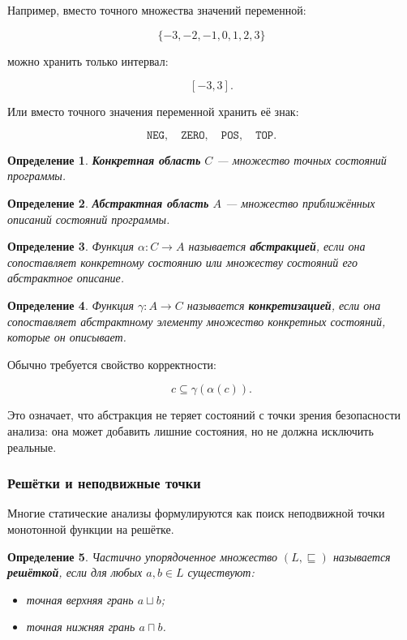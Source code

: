 \documentclass[12pt,a4paper]{article}
\newtheorem{definition}{Определение}
\begin{document}
Например, вместо точного множества значений переменной:

\[
\{ -3, -2, -1, 0, 1, 2, 3 \}
\]

можно хранить только интервал:

\[
[-3,3].
\]

Или вместо точного значения переменной хранить её знак:

\[
\texttt{NEG},\quad \texttt{ZERO},\quad \texttt{POS},\quad \texttt{TOP}.
\]

\begin{definition}
\textbf{Конкретная область} $C$ --- множество точных состояний программы.
\end{definition}

\begin{definition}
\textbf{Абстрактная область} $A$ --- множество приближённых описаний состояний программы.
\end{definition}

\begin{definition}
Функция $\alpha : C \to A$ называется \textbf{абстракцией}, если она сопоставляет конкретному состоянию или множеству состояний его абстрактное описание.
\end{definition}

\begin{definition}
Функция $\gamma : A \to C$ называется \textbf{конкретизацией}, если она сопоставляет абстрактному элементу множество конкретных состояний, которые он описывает.
\end{definition}

Обычно требуется свойство корректности:

\[
c \subseteq \gamma(\alpha(c)).
\]

Это означает, что абстракция не теряет состояний с точки зрения безопасности анализа: она может добавить лишние состояния, но не должна исключить реальные.

\subsubsection{Решётки и неподвижные точки}

Многие статические анализы формулируются как поиск неподвижной точки монотонной функции на решётке.

\begin{definition}
Частично упорядоченное множество $(L,\sqsubseteq)$ называется \textbf{решёткой}, если для любых $a,b \in L$ существуют:
\begin{itemize}
  \item точная верхняя грань $a \sqcup b$;
  \item точная нижняя грань $a \sqcap b$.
\end{itemize}
\end{definition}
\end{document}
